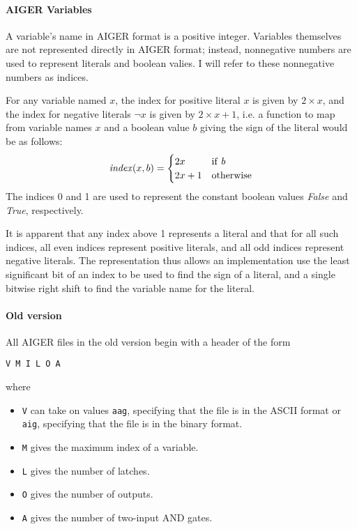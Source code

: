 \documentclass[12pt,a4paper,twoside,openright]{report}
\begin{document}
\paragraph{AIGER Variables}{
A variable's name in AIGER format is a positive integer. Variables themselves
are not represented directly in AIGER format; instead, nonnegative numbers
are used to represent literals and boolean valies.
I will refer to these nonnegative numbers as indices.

For any variable named $x$, the index for positive literal $x$ is given by
$2 \times x$, and the index for negative literals $\neg x$ is given by
$2 \times x + 1$, i.e. a function to map from variable names $x$ and a boolean
value $b$ giving the sign of the literal would be as follows:
$${\it index}(x, b) =
\begin{cases}
2x & {\rm if}~b \\
2x + 1 & {\rm otherwise}
\end{cases}$$
The indices 0 and 1 are used to represent the constant boolean values {\it False}
and {\it True}, respectively.

It is apparent that any index above 1 represents a literal and that for all such
indices, all even indices represent positive literals, and all odd indices
represent negative literals. The representation thus allows an implementation
use the least significant bit of an index to be used to find the sign of a literal,
and a single bitwise right shift to find the variable name for the literal.

\paragraph{Old version}{
All AIGER files in the old version begin with a header of the form
\begin{verbatim}
V M I L O A
\end{verbatim}
where
\begin{itemize}
\item \verb,V, can take on values \verb,aag,, specifying that the file is in the ASCII format or \verb,aig,,
specifying that the file is in the binary format.
\item \verb,M, gives the maximum index of a variable.
\item \verb,L, gives the number of latches.
\item \verb,O, gives the number of outputs.
\item \verb,A, gives the number of two-input AND gates.
\end{itemize}

}}
\end{document}
